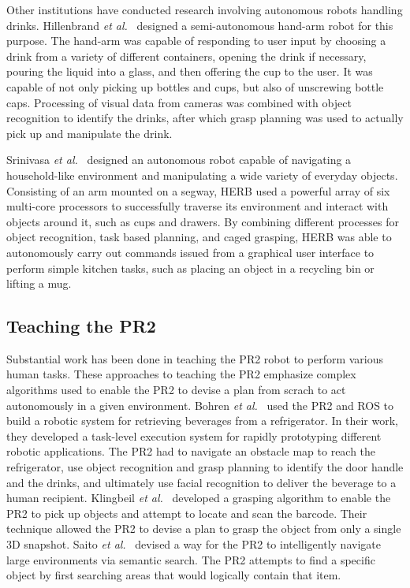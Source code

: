 \documentclass{sig-alternate}
\begin{document}
\indent Other institutions have conducted research involving autonomous robots handling
drinks. Hillenbrand \textit{et al.}~\cite{pouring_arm} designed a 
semi-autonomous hand-arm robot for this purpose. The hand-arm was capable of 
responding to user input by choosing a drink from a variety of different 
containers, opening the drink if necessary, pouring the liquid into a glass, 
and then offering the cup to the user. It was capable of not only picking up 
bottles and cups, but also of unscrewing bottle caps. Processing of visual data
from cameras was combined with object recognition to identify the drinks, after
which grasp planning was used to actually pick up and manipulate the drink.

\indent Srinivasa \textit{et al.}~\cite{herb} designed an autonomous robot capable of 
navigating a household-like environment and manipulating a wide variety of 
everyday objects. Consisting of an arm mounted on a segway, HERB used a 
powerful array of six multi-core processors to successfully traverse its 
environment and interact with objects around it, such as cups and drawers. By 
combining different processes for object recognition, task based planning, and 
caged grasping, HERB was able to autonomously carry out commands issued from a 
graphical user interface to perform simple kitchen tasks, such as placing an 
object in a recycling bin or lifting a mug.

\subsection{Teaching the PR2}
\label{sec:teach_pr2}
\indent Substantial work has been done in teaching the PR2 robot to perform various human tasks.  These approaches to teaching the PR2 emphasize complex algorithms used 
to enable the PR2 to devise a plan from scrach to act autonomously in a 
given environment.  Bohren \textit{et al.}~\cite{beer} used the PR2 and ROS to build a robotic 
system for retrieving beverages from a refrigerator. In their work, they developed a task-level execution system for rapidly prototyping different robotic applications. 
The PR2 had to navigate an obstacle map to reach the refrigerator, use object recognition and grasp planning to identify the door handle and the drinks, and ultimately use 
facial recognition to deliver the beverage to a human recipient. 
Klingbeil \textit{et al.}~\cite{groceries} developed a grasping algorithm to enable the PR2 to pick up objects and attempt to locate and scan the barcode. Their 
technique allowed the PR2 to devise a plan to grasp the object from only a single 3D snapshot.
Saito \textit{et al.}~\cite{subway} devised a way for the PR2 to intelligently 
navigate large environments via semantic search. The PR2 attempts to find a specific object by first searching areas that would logically contain that item.
\end{document}
